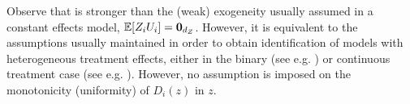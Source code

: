 \noindent
Observe that  is stronger than the (weak) exogeneity usually assumed in a constant effects model, \(\mathbb{E}[Z_iU_i]=\mathbf{0}_{d_Z}\). However, it is equivalent to the assumptions usually maintained
in order to obtain identification of models with heterogeneous treatment effects, either in the binary  (see e.g. \citealp{angristTwoStageLeastSquares1995}) or continuous treatment case (see e.g. \citealp{angristInterpretationInstrumentalVariables2000}). However, no assumption is imposed on  the monotonicity (uniformity) of \(D_i(z)\) in \(z\). 

